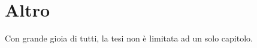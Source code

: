 \chapter{Altro}

Con grande gioia di tutti, la tesi non è limitata ad un solo capitolo.

\vfill\break